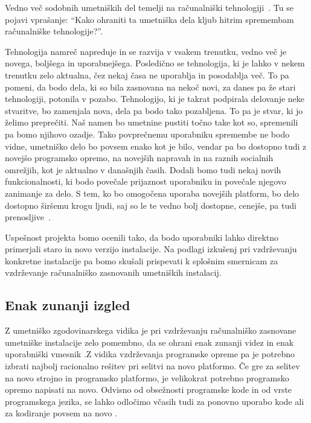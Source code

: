 \renewcommand{\thesubsection}{\arabic{subsection}}

Vedno več sodobnih umetniških del temelji na računalniški tehnologiji~\cite{digitalartconservation}. Tu se pojavi vprašanje: ``Kako ohraniti ta umetniška dela kljub hitrim spremembam računalniške tehnologije?''.

Tehnologija namreč napreduje in se razvija v vsakem trenutku, vedno več je novega, boljšega in uporabnejšega. Posledično se tehnologija, ki je lahko v nekem trenutku zelo aktualna, čez nekaj časa ne uporablja in posodablja več. To pa pomeni, da bodo dela, ki so bila zasnovana na nekoč novi, za danes pa že stari tehnologiji, potonila v pozabo. Tehnologijo, ki je takrat podpirala delovanje neke stvaritve, bo zamenjala nova, dela pa bodo tako pozabljena. To pa je stvar, ki jo želimo preprečiti. Naš namen bo umetnine pustiti točno take kot so, spremenili pa bomo njihovo ozadje. Tako povprečnemu uporabniku spremembe ne bodo vidne, umetniško delo bo povsem enako kot je bilo, vendar pa bo dostopno tudi z novejšo programsko opremo, na novejših napravah in na raznih socialnih omrežjih, kot je aktualno v današnjih časih. Dodali bomo tudi nekaj novih funkcionalnosti, ki bodo povečale prijaznost uporabniku in povečale njegovo zanimanje za delo. S tem, ko bo omogočena uporaba novejših platform, bo delo dostopno širšemu krogu ljudi, saj so le te vedno bolj dostopne, cenejše, pa tudi prenosljive~\cite{vzdrzevanjeProgramskeOpreme}.

Uspešnost projekta bomo ocenili tako, da bodo uporabniki lahko direktno primerjali staro in novo verzijo instalacije.
Na podlagi izku\v senj pri vzdr\v zevanju konkretne instalacije pa bomo sku\v sali prispevati k splo\v snim smernicam za vzdr\v zevanje ra\v cunalni\v sko zasnovanih
umetni\v skih instalacij.


\subsection{Enak zunanji izgled}

Z umetni\v sko zgodovinarskega vidika je pri vzdr\v zevanju ra\v cunalni\v sko zasnovane umetni\v ske instalacije zelo pomembno, da se ohrani
enak zunanji videz in enak uporabni\v ski vmesnik \cite{digitalartconservation} .Z vidika vzdr\v zevanja programske opreme pa je potrebno izbrati najbolj racionalno re\v sitev
pri selitvi na novo platformo.
\v Ce gre za selitev na novo strojno in programsko platformo, je velikokrat potrebno programsko opremo napisati na novo. Odvisno od obse\v znosti programske
kode in od vrste programskega jezika, se lahko odlo\v cimo v\v casih tudi za ponovno uporabo kode ali za kodiranje povsem na novo \cite{vzdrzevanjeProgramskeOpreme}.

